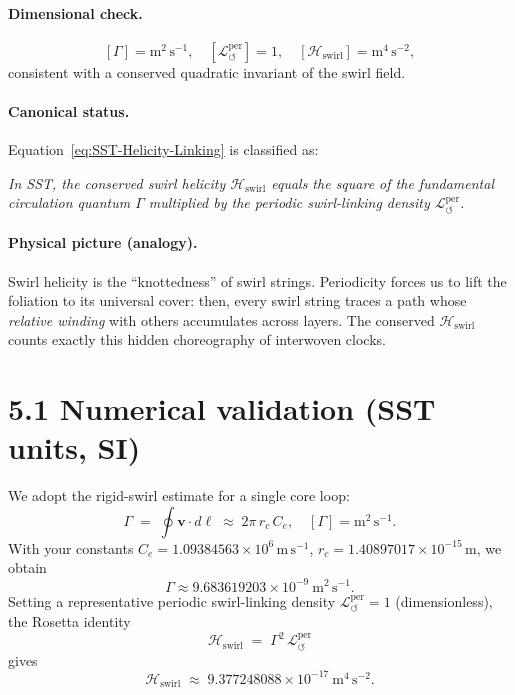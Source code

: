\documentclass[11pt]{article}
\begin{document}
\paragraph{Dimensional check.}
    \[
        [\Gamma] = \mathrm{m}^2 \,\mathrm{s}^{-1},
        \quad [\mathcal{L}_{\circlearrowleft}^{\mathrm{per}}]=1,
        \quad [\mathcal{H}_{\text{swirl}}] = \mathrm{m}^4 \,\mathrm{s}^{-2},
    \]
    consistent with a conserved quadratic invariant of the swirl field.

\paragraph{Canonical status.}
    Equation~\eqref{eq:SST-Helicity-Linking} is classified as:
    \begin{center}
    \end{center}
    \emph{In SST, the conserved swirl helicity $\mathcal{H}_{\text{swirl}}$ equals the square of the fundamental circulation quantum $\Gamma$ multiplied by the periodic swirl-linking density $\mathcal{L}_{\circlearrowleft}^{\mathrm{per}}$.}

\paragraph{Physical picture (analogy).}
    Swirl helicity is the ``knottedness'' of swirl strings. Periodicity forces us to lift the foliation to its universal cover: then, every swirl string traces a path whose \emph{relative winding} with others accumulates across layers. The conserved $\mathcal{H}_{\text{swirl}}$ counts exactly this hidden choreography of interwoven clocks.

\section*{5.1 Numerical validation (SST units, SI)}
We adopt the rigid-swirl estimate for a single core loop:
\[
    \Gamma \;=\; \oint \mathbf{v}\cdot d\boldsymbol{\ell}
    \;\approx\; 2\pi\, r_c\, C_e,
    \quad
    [\Gamma]=\mathrm{m^2\,s^{-1}}.
\]
With your constants
\( C_e = 1.09384563\times 10^{6}\,\mathrm{m\,s^{-1}}\),
\( r_c = 1.40897017\times 10^{-15}\,\mathrm{m}\),
we obtain
\[
    \Gamma \approx 9.683619203\times 10^{-9}\ \mathrm{m^2\,s^{-1}}.
\]
Setting a representative periodic swirl-linking density
\( \mathcal{L}_{\circlearrowleft}^{\mathrm{per}} = 1 \) (dimensionless),
the Rosetta identity
\[
    \mathcal{H}_{\text{swirl}} \;=\; \Gamma^2\, \mathcal{L}_{\circlearrowleft}^{\mathrm{per}}
\]
gives
\[
    \mathcal{H}_{\text{swirl}}
    \;\approx\; 9.377248088\times 10^{-17}\ \mathrm{m^4\,s^{-2}}.
\]
\end{document}
